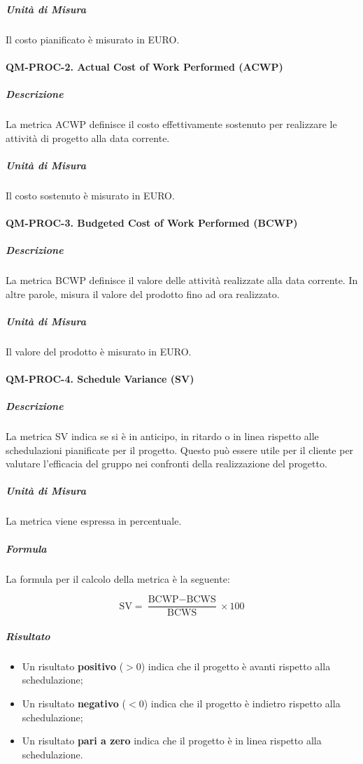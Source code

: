 			\subparagraph{Unità di Misura}
			Il costo pianificato è misurato in EURO.

		\paragraph{QM-PROC-2. Actual Cost of Work Performed (ACWP)}

			\subparagraph{Descrizione}
			La metrica ACWP definisce il costo effettivamente sostenuto per realizzare le attività di progetto alla data corrente.

			\subparagraph{Unità di Misura}
			Il costo sostenuto è misurato in EURO.

		\paragraph{QM-PROC-3. Budgeted Cost of Work Performed (BCWP)}

			\subparagraph{Descrizione}
			La metrica BCWP definisce il valore delle attività realizzate alla data corrente. In altre parole, misura il valore del prodotto fino ad ora realizzato.

			\subparagraph{Unità di Misura}
			Il valore del prodotto è misurato in EURO.

		\paragraph{QM-PROC-4. Schedule Variance (SV)}

			\subparagraph{Descrizione}
			La metrica SV indica se si è in anticipo, in ritardo o in linea rispetto alle schedulazioni pianificate per il progetto. Questo può essere utile per il cliente per valutare l'efficacia del gruppo nei confronti della realizzazione del progetto.

			\subparagraph{Unità di Misura}
			La metrica viene espressa in percentuale.

			\subparagraph{Formula}
			La formula per il calcolo della metrica è la seguente:

			\[
				\text{SV} = \frac{\text{BCWP} - \text{BCWS}}{\text{BCWS}} \times 100
			\]

			\subparagraph{Risultato}
			\begin{itemize}
				\item Un risultato \textbf{positivo} (\(> 0\)) indica che il progetto è avanti rispetto alla schedulazione;
				\item Un risultato \textbf{negativo} (\(< 0\)) indica che il progetto è indietro rispetto alla schedulazione;
				\item Un risultato \textbf{pari a zero} indica che il progetto è in linea rispetto alla schedulazione.
			\end{itemize}

